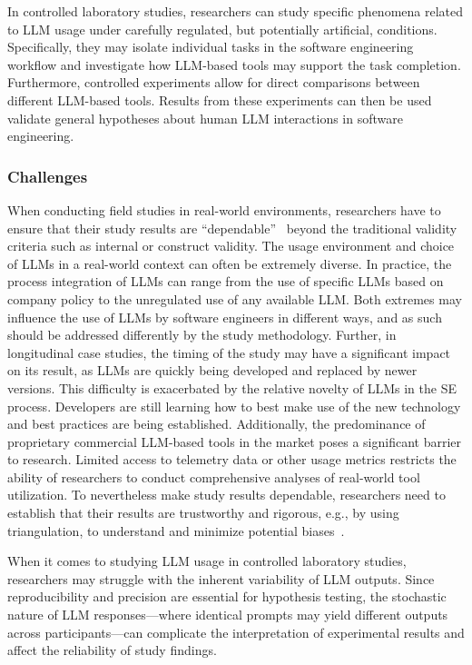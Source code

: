 In controlled laboratory studies, researchers can study specific phenomena related to LLM usage under carefully regulated, but potentially artificial, conditions.
Specifically, they may isolate individual tasks in the software engineering workflow and investigate how LLM-based tools may support the task completion.
Furthermore, controlled experiments allow for direct comparisons between different LLM-based tools.
Results from these experiments can then be used validate general hypotheses about human LLM interactions in software engineering.

\subsubsection{Challenges}

When conducting field studies in real-world environments, researchers have to ensure that their study results are ``dependable''~\cite{Sullivan2011-ub} beyond the traditional validity criteria such as internal or construct validity.
The usage environment and choice of LLMs in a real-world context can often be extremely diverse.
In practice, the process integration of LLMs can range from the use of specific LLMs based on company policy to the unregulated use of any available LLM. 
Both extremes may influence the use of LLMs by software engineers in different ways, and as such should be addressed differently by the study methodology.
Further, in longitudinal case studies, the timing of the study may have a significant impact on its result, as LLMs are quickly being developed and replaced by newer versions.
This difficulty is exacerbated by the relative novelty of LLMs in the SE process.
Developers are still learning how to best make use of the new technology and best practices are being established.
Additionally, the predominance of proprietary commercial LLM-based tools in the market poses a significant barrier to research.
Limited access to telemetry data or other usage metrics restricts the ability of researchers to conduct comprehensive analyses of real-world tool utilization.
To nevertheless make study results dependable, researchers need to establish that their results are trustworthy and rigorous, e.g., by using triangulation, to understand and minimize potential biases~\cite{Sullivan2011-ub}.
 
When it comes to studying LLM usage in controlled laboratory studies, researchers may struggle with the inherent variability of LLM outputs.
Since reproducibility and precision are essential for hypothesis testing, the stochastic nature of LLM responses---where identical prompts may yield different outputs across participants---can complicate the interpretation of experimental results and affect the reliability of study findings.


